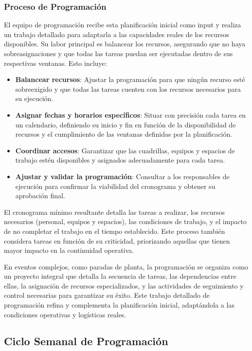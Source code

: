 \documentclass{article}
\begin{document}
\subsubsection{Proceso de Programación}

El equipo de programación recibe esta planificación inicial como input y realiza un trabajo detallado para adaptarla a las capacidades reales de los recursos disponibles. Su labor principal es balancear los recursos, asegurando que no haya sobreasignaciones y que todas las tareas puedan ser ejecutadas dentro de sus respectivas ventanas. Esto incluye:

\begin{itemize} \item \textbf{Balancear recursos}: Ajustar la programación para que ningún recurso esté sobreexigido y que todas las tareas cuenten con los recursos necesarios para su ejecución. \item \textbf{Asignar fechas y horarios específicos}: Situar con precisión cada tarea en un calendario, definiendo su inicio y fin en función de la disponibilidad de recursos y el cumplimiento de las ventanas definidas por la planificación. \item \textbf{Coordinar accesos}: Garantizar que las cuadrillas, equipos y espacios de trabajo estén disponibles y asignados adecuadamente para cada tarea. \item \textbf{Ajustar y validar la programación}: Consultar a los responsables de ejecución para confirmar la viabilidad del cronograma y obtener su aprobación final. \end{itemize}

El cronograma mínimo resultante detalla las tareas a realizar, los recursos necesarios (personal, equipos y espacios), las condiciones de trabajo, y el impacto de no completar el trabajo en el tiempo establecido. Este proceso también considera tareas en función de su criticidad, priorizando aquellas que tienen mayor impacto en la continuidad operativa.

En eventos complejos, como paradas de planta, la programación se organiza como un proyecto integral que detalla la secuencia de tareas, las dependencias entre ellas, la asignación de recursos especializados, y las actividades de seguimiento y control necesarias para garantizar su éxito. Este trabajo detallado de programación refina y complementa la planificación inicial, adaptándola a las condiciones operativas y logísticas reales.

\subsection{Ciclo Semanal de Programación}
\end{document}
